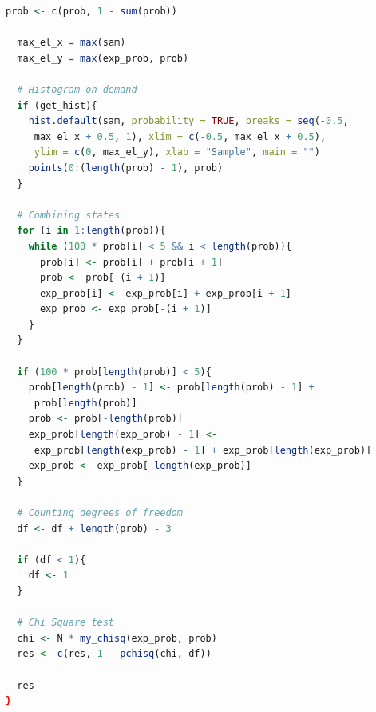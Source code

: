 \documentclass[12pt, specialist, subf, substylefile = spbu_report.rtx]{disser}
\begin{document}
\begin{lstlisting}[language=R]
  prob <- c(prob, 1 - sum(prob))

  max_el_x = max(sam)
  max_el_y = max(exp_prob, prob)

  # Histogram on demand
  if (get_hist){
    hist.default(sam, probability = TRUE, breaks = seq(-0.5,
     max_el_x + 0.5, 1), xlim = c(-0.5, max_el_x + 0.5),
     ylim = c(0, max_el_y), xlab = "Sample", main = "")
    points(0:(length(prob) - 1), prob)
  }

  # Combining states
  for (i in 1:length(prob)){
    while (100 * prob[i] < 5 && i < length(prob)){
      prob[i] <- prob[i] + prob[i + 1]
      prob <- prob[-(i + 1)]
      exp_prob[i] <- exp_prob[i] + exp_prob[i + 1]
      exp_prob <- exp_prob[-(i + 1)]
    }
  }
	
  if (100 * prob[length(prob)] < 5){
    prob[length(prob) - 1] <- prob[length(prob) - 1] +
     prob[length(prob)]
    prob <- prob[-length(prob)]
    exp_prob[length(exp_prob) - 1] <-
     exp_prob[length(exp_prob) - 1] + exp_prob[length(exp_prob)]
    exp_prob <- exp_prob[-length(exp_prob)]
  }
	
  # Counting degrees of freedom
  df <- df + length(prob) - 3
	
  if (df < 1){
    df <- 1
  }
	
  # Chi Square test
  chi <- N * my_chisq(exp_prob, prob)
  res <- c(res, 1 - pchisq(chi, df))
	
  res
}
	\end{lstlisting}
\end{document}
